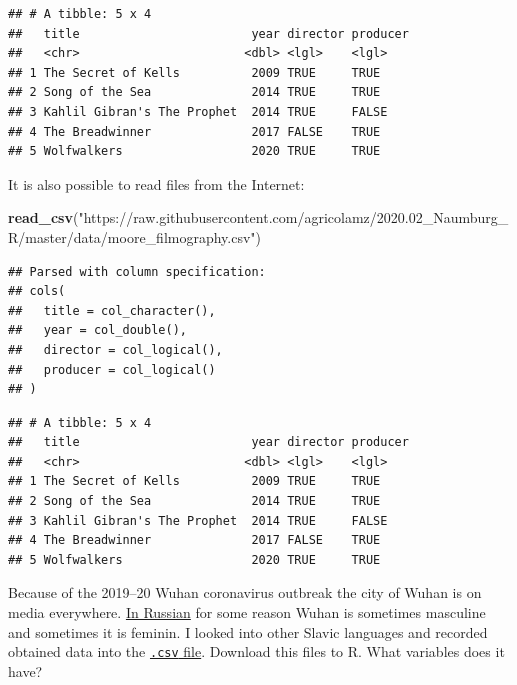\documentclass[
]{book}
\makeatletter
\newenvironment{Shaded}{\begin{snugshade}}{\end{snugshade}}
\newcommand{\KeywordTok}[1]{\textcolor[rgb]{0.13,0.29,0.53}{\textbf{#1}}}
\newcommand{\NormalTok}[1]{#1}
\newcommand{\StringTok}[1]{\textcolor[rgb]{0.31,0.60,0.02}{#1}}
\newenvironment{kframe}{%
\medskip{}
\setlength{\fboxsep}{.8em}
 \def\at@end@of@kframe{}%
 \ifinner\ifhmode%
  \def\at@end@of@kframe{\end{minipage}}%
  \begin{minipage}{\columnwidth}%
 \fi\fi%
 \def\FrameCommand##1{\hskip\@totalleftmargin \hskip-\fboxsep
 \colorbox{shadecolor}{##1}\hskip-\fboxsep
     \hskip-\linewidth \hskip-\@totalleftmargin \hskip\columnwidth}%
 \MakeFramed {\advance\hsize-\width
   \@totalleftmargin\z@ \linewidth\hsize
   \@setminipage}}%
 {\par\unskip\endMakeFramed%
 \at@end@of@kframe}
\newenvironment{rmdblock}[1]
  {
  \begin{itemize}
  \renewcommand{\labelitemi}{
    \raisebox{-.7\height}[0pt][0pt]{
      {\setkeys{Gin}{width=3em,keepaspectratio}\texttt{[image: images/\#1]}}
    }
  }
  \setlength{\fboxsep}{1em}
  \begin{kframe}
  \item
  }
  {
  \end{kframe}
  \end{itemize}
  }
\newenvironment{rmdtask}
  {\begin{rmdblock}{task}}
  {\end{rmdblock}}
\makeatother
\begin{document}
\begin{verbatim}
## # A tibble: 5 x 4
##   title                        year director producer
##   <chr>                       <dbl> <lgl>    <lgl>   
## 1 The Secret of Kells          2009 TRUE     TRUE    
## 2 Song of the Sea              2014 TRUE     TRUE    
## 3 Kahlil Gibran's The Prophet  2014 TRUE     FALSE   
## 4 The Breadwinner              2017 FALSE    TRUE    
## 5 Wolfwalkers                  2020 TRUE     TRUE
\end{verbatim}

It is also possible to read files from the Internet:

\begin{Shaded}
\begin{Highlighting}[]
\KeywordTok{read_csv}\NormalTok{(}\StringTok{"https://raw.githubusercontent.com/agricolamz/2020.02_Naumburg_R/master/data/moore_filmography.csv"}\NormalTok{)}
\end{Highlighting}
\end{Shaded}

\begin{verbatim}
## Parsed with column specification:
## cols(
##   title = col_character(),
##   year = col_double(),
##   director = col_logical(),
##   producer = col_logical()
## )
\end{verbatim}

\begin{verbatim}
## # A tibble: 5 x 4
##   title                        year director producer
##   <chr>                       <dbl> <lgl>    <lgl>   
## 1 The Secret of Kells          2009 TRUE     TRUE    
## 2 Song of the Sea              2014 TRUE     TRUE    
## 3 Kahlil Gibran's The Prophet  2014 TRUE     FALSE   
## 4 The Breadwinner              2017 FALSE    TRUE    
## 5 Wolfwalkers                  2020 TRUE     TRUE
\end{verbatim}

\begin{rmdtask}
Because of the 2019--20 Wuhan coronavirus outbreak the city of Wuhan is
on media everywhere. \href{https://nplus1.ru/blog/2020/02/03/wuhan}{In
Russian} for some reason Wuhan is sometimes masculine and sometimes it
is feminin. I looked into other Slavic languages and recorded obtained
data into the
\href{https://gist.githubusercontent.com/agricolamz/c280527d6b5d79693b85d8fcf8d35bc3/raw/c46a32a218bc5d6933703ae677b81ff5a4a1dcaa/wuhan.csv}{\texttt{.csv}
file}. Download this files to R. What variables does it have?
\end{rmdtask}
\end{document}
